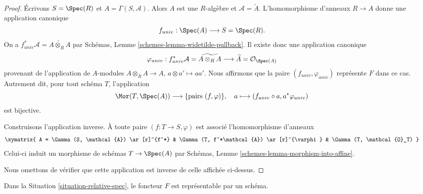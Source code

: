 \begin{proof}
Écrivons $S = \Spec(R)$ et $A = \Gamma(S, \mathcal{A})$.
Alors $A$ est une $R$-algèbre et $\mathcal{A} = \widetilde A$.
L'homomorphisme d'anneaux $R \to A$ donne une application canonique
$$
f_{univ} : \Spec(A)
\longrightarrow
S = \Spec(R).
$$
On a
$f_{univ}^*\mathcal{A} =  \widetilde{A \otimes_R A}$
par Schémas, Lemme \ref{schemes-lemma-widetilde-pullback}.
Il existe donc une application canonique
$$
\varphi_{univ} :
f_{univ}^*\mathcal{A} = \widetilde{A \otimes_R A}
\longrightarrow
\widetilde A = \mathcal{O}_{\Spec(A)}
$$
provenant de l'application de $A$-modules $A \otimes_R A \to A$,
$a \otimes a' \mapsto aa'$. Nous affirmons que la paire
$(f_{univ}, \varphi_{univ})$ représente $F$ dans ce cas.
Autrement dit, pour tout schéma $T$, l'application
$$
\Mor(T, \Spec(A)) \longrightarrow \{\text{pairs } (f, \varphi)\},\quad
a \longmapsto (f_{univ} \circ a, a^*\varphi_{univ})
$$
est bijective.

\medskip\noindent
Construisons l'application inverse.
À toute paire $(f : T \to S, \varphi)$
est associé l'homomorphisme d'anneaux
$$
\xymatrix{
A = \Gamma(S, \mathcal{A}) \ar[r]^{f^*} &
\Gamma(T, f^*\mathcal{A}) \ar[r]^{\varphi} &
\Gamma(T, \mathcal{O}_T)
}
$$
Celui-ci induit un morphisme de schémas $T \to \Spec(A)$
par Schémas, Lemme \ref{schemes-lemma-morphism-into-affine}.

\medskip\noindent
Nous omettons de vérifier que cette application est inverse de celle
affichée ci-dessus.
\end{proof}

\begin{lemma}
\label{lemma-spec}
Dans la Situation \ref{situation-relative-spec},
le foncteur $F$ est représentable par un schéma.
\end{lemma}


